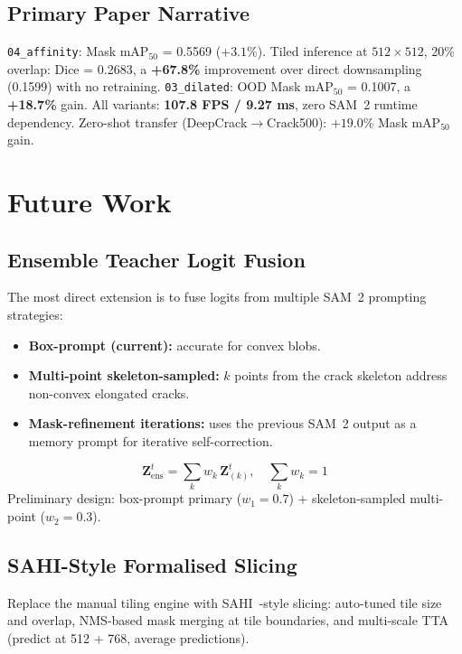 \documentclass[12pt,a4paper]{article}
\begin{document}
\subsection{Primary Paper Narrative}

\texttt{04\_affinity}: Mask mAP$_{50}$ = 0.5569 ($+3.1\%$).
Tiled inference at $512\times512$, 20\% overlap: Dice = 0.2683,
a \textbf{+67.8\%} improvement over direct downsampling (0.1599) with no
retraining.
\texttt{03\_dilated}: OOD Mask mAP$_{50}$ = 0.1007, a \textbf{+18.7\%} gain.
All variants: \textbf{107.8 FPS / 9.27 ms}, zero SAM~2 runtime dependency.
Zero-shot transfer (DeepCrack$\to$Crack500): $+19.0\%$ Mask mAP$_{50}$ gain.

\section{Future Work}
\label{sec:future}

\subsection{Ensemble Teacher Logit Fusion}

The most direct extension is to fuse logits from multiple SAM~2 prompting
strategies:
\begin{itemize}
  \item \textbf{Box-prompt (current):} accurate for convex blobs.
  \item \textbf{Multi-point skeleton-sampled:} $k$ points from the crack
    skeleton address non-convex elongated cracks.
  \item \textbf{Mask-refinement iterations:} uses the previous SAM~2 output as
    a memory prompt for iterative self-correction.
\end{itemize}
\[
\mathbf{Z}^t_\text{ens}=\sum_k w_k\,\mathbf{Z}^t_{(k)},\quad\sum_k w_k=1
\]
Preliminary design: box-prompt primary ($w_1=0.7$) + skeleton-sampled
multi-point ($w_2=0.3$).

\subsection{SAHI-Style Formalised Slicing}

Replace the manual tiling engine with SAHI~\cite{akyon2022sahi}-style slicing:
auto-tuned tile size and overlap, NMS-based mask merging at tile boundaries,
and multi-scale TTA (predict at 512 + 768, average predictions).
\end{document}
